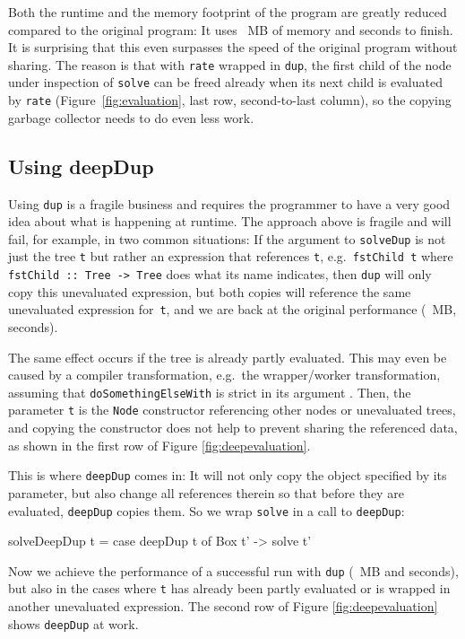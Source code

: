 \documentclass[preprint]{sigplanconf}
\theoremstyle{nonumberplain}
\newcommand{\li}{\lstinline[style=Haskell]}
\begin{document}
Both the runtime and the memory footprint of the program are greatly reduced compared to the original program: It uses ~MB of memory and  seconds to finish. It is surprising that this even surpasses the speed of the original program without sharing. The reason is that with \li-rate- wrapped in \li-dup-, the first child of the node under inspection of \li-solve- can be freed already when its next child is evaluated by \li-rate- (Figure~\ref{fig:evaluation}, last row, second-to-last column), so the copying garbage collector needs to do even less work.

\subsection{Using deepDup}

\label{sec:deepdup}
Using \li-dup- is a fragile business and requires the programmer to have a very good idea about what is happening at runtime. The approach above is fragile and will fail, for example, in two common situations: If the argument to \li-solveDup- is not just the tree \li-t- but rather an expression that references \li-t-, e.g.\ \li-fstChild t- where \li!fstChild :: Tree -> Tree! does what its name indicates, then \li-dup- will only copy this unevaluated expression, but both copies will reference the same unevaluated expression for~\li-t-, and we are back at the original performance (~MB,  seconds).

The same effect occurs if the tree is already partly evaluated. This may even be caused by a compiler transformation, e.g.\ the wrapper/worker transformation, assuming that \li-doSomethingElseWith- is strict  in its argument \citep{unboxed}. Then, the parameter \li-t- is the \li-Node- constructor referencing other nodes or unevaluated trees, and copying the constructor does not help to prevent sharing the referenced data, as shown in the first row of Figure \ref{fig:deepevaluation}.

This is where \li-deepDup- comes in: It will not only copy the object specified by its parameter, but also change all references therein so that before they are evaluated, \li-deepDup- copies them. So we wrap \li-solve- in a call to \li-deepDup-:
\begin{haskell}
solveDeepDup t = case deepDup t of Box t' -> solve t'
\end{haskell}
Now we achieve the performance of a successful run with \li-dup- (~MB and  seconds), but also in the cases where \li-t- has already been partly evaluated or is wrapped in another unevaluated expression. The second row of Figure \ref{fig:deepevaluation} shows \li-deepDup- at work.
\end{document}
